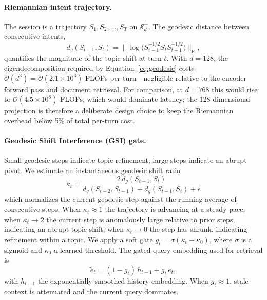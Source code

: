 \documentclass[preprint,12pt]{elsarticle}
\begin{document}
\paragraph{Riemannian intent trajectory.} The session is a trajectory $S_1,S_2,\dots,S_T$ on $\mathcal{S}_d^+$. The geodesic distance between consecutive intents,
\begin{equation}
d_g(S_{t-1},S_t) = \bigl\| \log\bigl(S_{t-1}^{-1/2} S_t S_{t-1}^{-1/2}\bigr) \bigr\|_{\mathrm{F}},
\label{eq:geodesic}
\end{equation}
quantifies the magnitude of the topic shift at turn $t$. With $d=128$, the eigendecomposition required by Equation~\ref{eq:geodesic} costs $\mathcal{O}(d^3)=\mathcal{O}(2.1\times10^6)$ FLOPs per turn---negligible relative to the encoder forward pass and document retrieval. For comparison, at $d=768$ this would rise to $\mathcal{O}(4.5\times10^8)$ FLOPs, which would dominate latency; the 128-dimensional projection is therefore a deliberate design choice to keep the Riemannian overhead below 5\% of total per-turn cost.

\paragraph{Geodesic Shift Interference (GSI) gate.} Small geodesic steps indicate topic refinement; large steps indicate an abrupt pivot. We estimate an instantaneous geodesic shift ratio
\begin{equation}
\kappa_t = \frac{2\,d_g(S_{t-1},S_t)}{d_g(S_{t-2},S_{t-1}) + d_g(S_{t-1},S_t) + \epsilon}
\label{eq:gsr}
\end{equation}
which normalizes the current geodesic step against the running average of consecutive steps. When $\kappa_t \approx 1$ the trajectory is advancing at a steady pace; when $\kappa_t \to 2$ the current step is anomalously large relative to prior steps, indicating an abrupt topic shift; when $\kappa_t \to 0$ the step has shrunk, indicating refinement within a topic. We apply a soft gate $g_t = \sigma(\kappa_t-\kappa_0)$, where $\sigma$ is a sigmoid and $\kappa_0$ a learned threshold. The gated query embedding used for retrieval is
\begin{equation}
\tilde{e}_t = (1-g_t)\,h_{t-1} + g_t\,e_t,
\label{eq:gate}
\end{equation}
with $h_{t-1}$ the exponentially smoothed history embedding. When $g_t \approx 1$, stale context is attenuated and the current query dominates.
\end{document}
